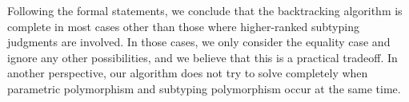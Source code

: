Following the formal statements, we conclude that the backtracking algorithm
is complete in most cases other than those where higher-ranked
subtyping judgments are involved.
In those cases, we only consider the equality case and ignore any other possibilities,
and we believe that this is a practical tradeoff.
In another perspective, our algorithm does not try to solve completely when
parametric polymorphism and subtyping polymorphism occur at the same time.



